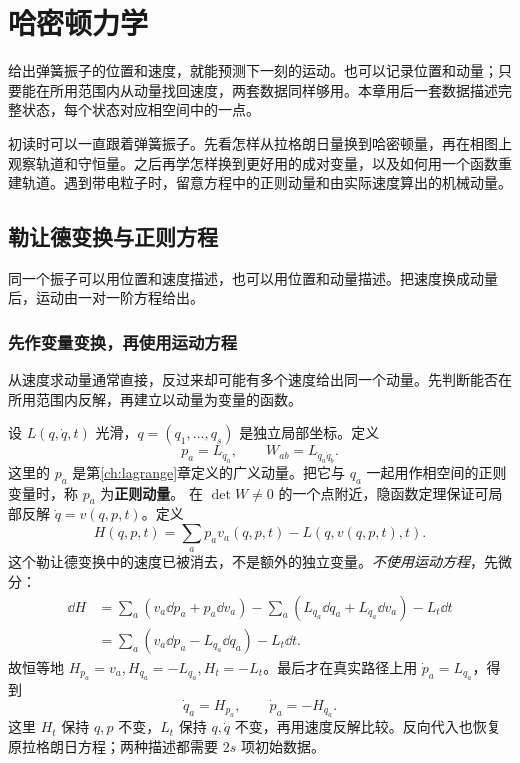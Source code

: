 \chapter{哈密顿力学}\label{ch:hamilton}

\begin{guidebox}
给出弹簧振子的位置和速度，就能预测下一刻的运动。也可以记录位置和动量；只要能在所用范围内从动量找回速度，两套数据同样够用。本章用后一套数据描述完整状态，每个状态对应相空间中的一点。

初读时可以一直跟着弹簧振子。先看怎样从拉格朗日量换到哈密顿量，再在相图上观察轨道和守恒量。之后再学怎样换到更好用的成对变量，以及如何用一个函数重建轨道。遇到带电粒子时，留意方程中的正则动量和由实际速度算出的机械动量。
\end{guidebox}

\section{勒让德变换与正则方程}
同一个振子可以用位置和速度描述，也可以用位置和动量描述。把速度换成动量后，运动由一对一阶方程给出。

\subsection{先作变量变换，再使用运动方程}
从速度求动量通常直接，反过来却可能有多个速度给出同一个动量。先判断能否在所用范围内反解，再建立以动量为变量的函数。

设 $L(q,\dot q,t)$ 光滑，$q=(q_1,\ldots,q_s)$ 是独立局部坐标。定义
\begin{equation}
p_a=L_{\dot q_a},\qquad W_{ab}=L_{\dot q_a\dot q_b}.
\label{eq:hamilton-momentum}
\end{equation}
这里的 $p_a$ 是第\ref{ch:lagrange}章定义的广义动量。把它与 $q_a$ 一起用作相空间的正则变量时，称 $p_a$ 为\textbf{正则动量}。
在 $\det W\ne0$ 的一个点附近，隐函数定理保证可局部反解 $\dot q=v(q,p,t)$。定义
\begin{equation}
H(q,p,t)=\sum_a p_av_a(q,p,t)-L(q,v(q,p,t),t).
\label{eq:hamiltonian}
\end{equation}
这个勒让德变换中的速度已被消去，不是额外的独立变量。\emph{不使用运动方程}，先微分：
\begin{align*}
\dd H&=\sum_a(v_a\dd p_a+p_a\dd v_a)
-\sum_a(L_{q_a}\dd q_a+L_{\dot q_a}\dd v_a)-L_t\dd t\\
&=\sum_a(v_a\dd p_a-L_{q_a}\dd q_a)-L_t\dd t.
\end{align*}
故恒等地 $H_{p_a}=v_a,H_{q_a}=-L_{q_a},H_t=-L_t$。最后才在真实路径上用 $\dot p_a=L_{q_a}$，得到
\begin{equation}
\boxed{\dot q_a=H_{p_a},\qquad\dot p_a=-H_{q_a}.}
\label{eq:canonical-equations}
\end{equation}
这里 $H_t$ 保持 $q,p$ 不变，$L_t$ 保持 $q,\dot q$ 不变，再用速度反解比较。反向代入也恢复原拉格朗日方程；两种描述都需要 $2s$ 项初始数据。

